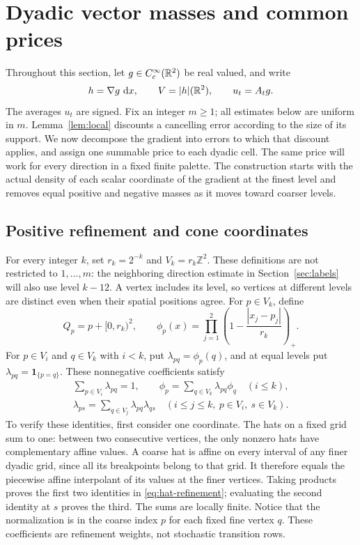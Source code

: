 \section{Dyadic vector masses and common prices}
\label{sec:prices}

Throughout this section, let $g\in C_c^\infty(\mathbb R^2)$ be real valued, and write
\[
 h=\nabla g\,\mathop{}\!\mathrm{d} x,
 \qquad V=|h|(\mathbb R^2),
 \qquad u_t=A_tg.
\]
The averages $u_t$ are signed. Fix an integer $m\ge1$; all estimates below
are uniform in $m$.
Lemma~\ref{lem:local} discounts a cancelling error according to the
size of its support. We now decompose the gradient into errors to which
that discount applies, and assign one summable price to each dyadic
cell. The same price will work for every direction in a fixed finite
palette. The construction starts with the actual density of each scalar
coordinate of the gradient at the finest level and removes equal positive
and negative masses as it moves toward coarser levels.

\subsection{Positive refinement and cone coordinates}

For every integer $k$, set $r_k=2^{-k}$ and $V_k=r_k\mathbb Z^2$.
These definitions are not restricted to $1,\ldots,m$: the neighboring
direction estimate in Section~\ref{sec:labels} will also use level
$k-12$.
A vertex includes its level, so vertices at different levels are distinct
even when their spatial positions agree. For $p\in V_k$, define
\[
 Q_p=p+[0,r_k)^2,
 \qquad
 \phi_p(x)=\prod_{j=1}^2
       \left(1-\frac{|x_j-p_j|}{r_k}\right)_+.
\]
For $p\in V_i$ and $q\in V_k$ with $i<k$, put
$\lambda_{pq}=\phi_p(q)$, and at equal levels put
$\lambda_{pq}=\mathbf 1_{\{p=q\}}$. These nonnegative coefficients satisfy
\begin{equation}
\begin{gathered}
 \sum_{p\in V_i}\lambda_{pq}=1,
 \qquad
 \phi_p=\sum_{q\in V_k}\lambda_{pq}\phi_q
 \quad (i\le k),
 \\
 \lambda_{ps}=\sum_{q\in V_j}\lambda_{pq}\lambda_{qs}
 \quad (i\le j\le k,\ p\in V_i,\ s\in V_k).
\end{gathered}
\label{eq:hat-refinement}
\end{equation}
To verify these identities, first consider one coordinate. The hats on a
fixed grid sum to one: between two consecutive vertices, the only nonzero
hats have complementary affine values. A coarse hat is affine on every
interval of any finer dyadic grid, since all its breakpoints belong to
that grid. It therefore equals the piecewise affine interpolant of its
values at the finer vertices. Taking products proves the first two
identities in \eqref{eq:hat-refinement}; evaluating the second identity at
$s$ proves the third. The sums are locally finite. Notice that the normalization is in
the coarse index $p$ for each fixed fine vertex $q$. These coefficients
are refinement weights, not stochastic transition rows.

